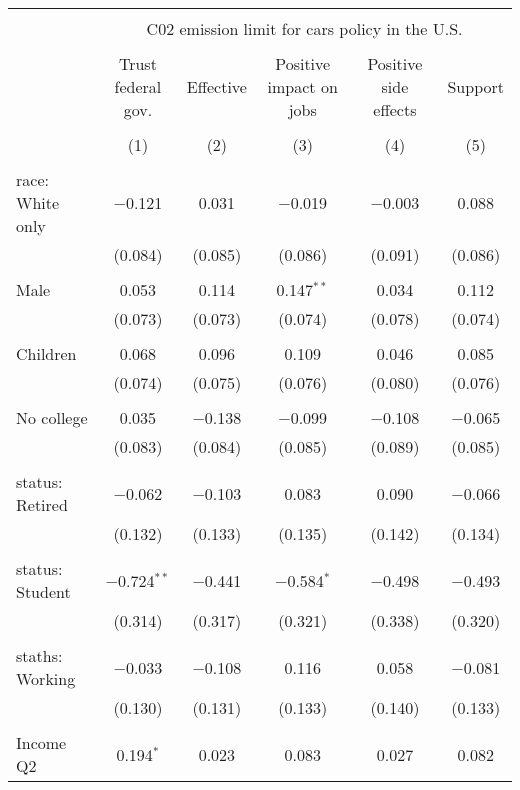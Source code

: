 
\begin{tabular}{@{\extracolsep{5pt}}lccccc} 
\\[-1.8ex]\hline 
\hline \\[-1.8ex] 
 & \multicolumn{5}{c}{C02 emission limit for cars policy in the U.S.} \\ 
\cline{2-6} 
\\[-1.8ex] & Trust federal gov. & Effective & Positive impact on jobs & Positive side effects & Support \\ 
\\[-1.8ex] & (1) & (2) & (3) & (4) & (5)\\ 
\hline \\[-1.8ex] 
 race: White only & $-$0.121 & 0.031 & $-$0.019 & $-$0.003 & 0.088 \\ 
  & (0.084) & (0.085) & (0.086) & (0.091) & (0.086) \\ 
  & & & & & \\ 
 Male & 0.053 & 0.114 & 0.147$^{**}$ & 0.034 & 0.112 \\ 
  & (0.073) & (0.073) & (0.074) & (0.078) & (0.074) \\ 
  & & & & & \\ 
 Children & 0.068 & 0.096 & 0.109 & 0.046 & 0.085 \\ 
  & (0.074) & (0.075) & (0.076) & (0.080) & (0.076) \\ 
  & & & & & \\ 
 No college & 0.035 & $-$0.138 & $-$0.099 & $-$0.108 & $-$0.065 \\ 
  & (0.083) & (0.084) & (0.085) & (0.089) & (0.085) \\ 
  & & & & & \\ 
 status: Retired & $-$0.062 & $-$0.103 & 0.083 & 0.090 & $-$0.066 \\ 
  & (0.132) & (0.133) & (0.135) & (0.142) & (0.134) \\ 
  & & & & & \\ 
 status: Student & $-$0.724$^{**}$ & $-$0.441 & $-$0.584$^{*}$ & $-$0.498 & $-$0.493 \\ 
  & (0.314) & (0.317) & (0.321) & (0.338) & (0.320) \\ 
  & & & & & \\ 
 staths: Working & $-$0.033 & $-$0.108 & 0.116 & 0.058 & $-$0.081 \\ 
  & (0.130) & (0.131) & (0.133) & (0.140) & (0.133) \\ 
  & & & & & \\ 
 Income Q2 & 0.194$^{*}$ & 0.023 & 0.083 & 0.027 & 0.082 \\ 

\end{tabular}
